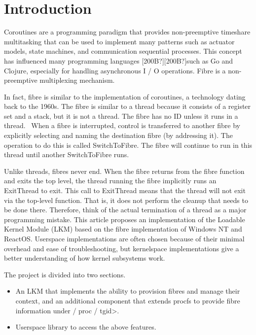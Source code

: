 \section{Introduction}
Coroutines are a programming paradigm that provides non-preemptive timeshare multitasking that can be used to implement many patterns such as actuator models, state machines, and communication sequential processes. This concept has influenced many programming languages [200B?][200B?]such as Go and Clojure, especially for handling asynchronous I / O operations. Fibre is a non-preemptive multiplexing mechanism. 

In fact, fibre is similar to the implementation of coroutines, a technology dating back to the 1960s. The fibre is similar to a thread because it consists of a register set and a stack, but it is not a thread. The fibre has no ID unless it runs in a thread. \ When a fibre is interrupted, control is transferred to another fibre by explicitly selecting and naming the destination fibre (by addressing it). The operation to do this is called SwitchToFibre. The fibre will continue to run in this thread until another SwitchToFibre runs.

Unlike threads, fibres never end. When the fibre returns from the fibre function and exits the top level, the thread running the fibre implicitly runs an ExitThread to exit. This call to ExitThread means that the thread will not exit via the top-level function. That is, it does not perform the cleanup that needs to be done there. Therefore, think of the actual termination of a thread as a major programming mistake. This article proposes an implementation of the Loadable Kernel Module (LKM) based on the fibre implementation of Windows NT and ReactOS. Userspace implementations are often chosen because of their minimal overhead and ease of troubleshooting, but kernelspace implementations give a better understanding of how kernel subsystems work.

The project is divided into two sections. 

\begin{itemize}
\item An LKM that implements the ability to provision fibres and manage their context, and an additional component that extends procfs to provide fibre information under / proc / tgid{\textgreater}.
\item Userspace library to access the above features.
\end{itemize}
